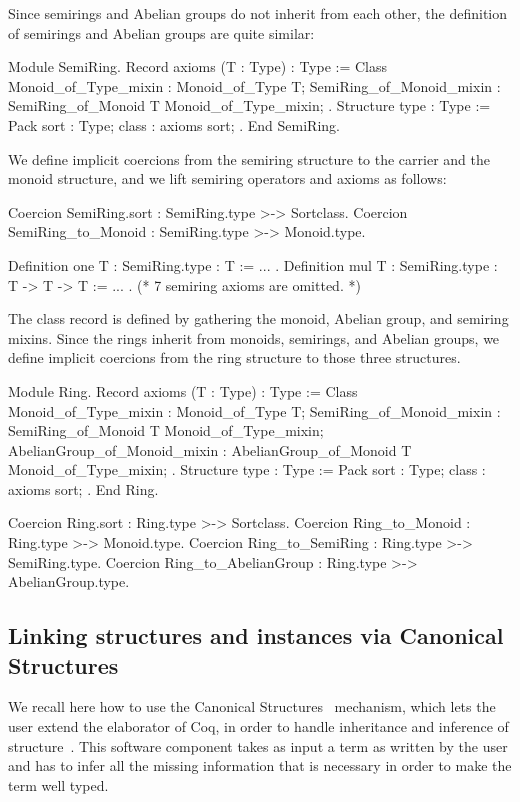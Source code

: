 \documentclass[a4paper,UKenglish,cleveref, autoref]{lipics-v2019}
\newcommand{\mixins}{mixins}
\theoremstyle{implem}
\theoremstyle{implem}
\theoremstyle{command}
\theoremstyle{commands}
\begin{document}
Since semirings and Abelian groups do not inherit from each other,
the definition of semirings and Abelian groups are quite similar:
\begin{coqcode}
Module SemiRing.
Record axioms (T : Type) : Type := Class {
  Monoid_of_Type_mixin : Monoid_of_Type T;
  SemiRing_of_Monoid_mixin : SemiRing_of_Monoid T Monoid_of_Type_mixin;
}.
Structure type : Type := Pack { sort : Type; class : axioms sort; }.
End SemiRing.
\end{coqcode}
We define implicit coercions from the semiring structure to the carrier
and the monoid structure, and we lift semiring operators and axioms as follows:
\begin{coqcode}
Coercion SemiRing.sort : SemiRing.type >-> Sortclass.
Coercion SemiRing_to_Monoid : SemiRing.type >-> Monoid.type.

Definition one {T : SemiRing.type} : T := ... .
Definition mul {T : SemiRing.type} : T -> T -> T := ... .
(* 7 semiring axioms are omitted. *)
\end{coqcode}

The class record is defined by gathering the monoid, Abelian group, and
semiring \mixins{}. Since the rings inherit from monoids, semirings, and
Abelian groups, we define implicit coercions from the ring structure to those
three structures.
\begin{coqcode}
Module Ring.
Record axioms (T : Type) : Type := Class {
  Monoid_of_Type_mixin : Monoid_of_Type T;
  SemiRing_of_Monoid_mixin : SemiRing_of_Monoid T Monoid_of_Type_mixin;
  AbelianGroup_of_Monoid_mixin : AbelianGroup_of_Monoid T Monoid_of_Type_mixin; }.
Structure type : Type := Pack { sort : Type; class : axioms sort; }.
End Ring.

Coercion Ring.sort : Ring.type >-> Sortclass.
Coercion Ring_to_Monoid : Ring.type >-> Monoid.type.
Coercion Ring_to_SemiRing : Ring.type >-> SemiRing.type.
Coercion Ring_to_AbelianGroup : Ring.type >-> AbelianGroup.type.
\end{coqcode}

\subsection{Linking structures and instances via Canonical Structures}

We recall here how to use the Canonical
Structures~\cite{DBLP:conf/itp/MahboubiT13,Saibi99phd} mechanism, which
lets the user extend the elaborator of Coq, in order to handle
inheritance and inference of structure~\cite{affeldt:hal-02463336,KSdraft,DBLP:conf/tphol/GarillotGMR09}.
This software component
takes as input a term as written by the user and has to infer all the missing information that is necessary in order to make the term well typed.
\end{document}
